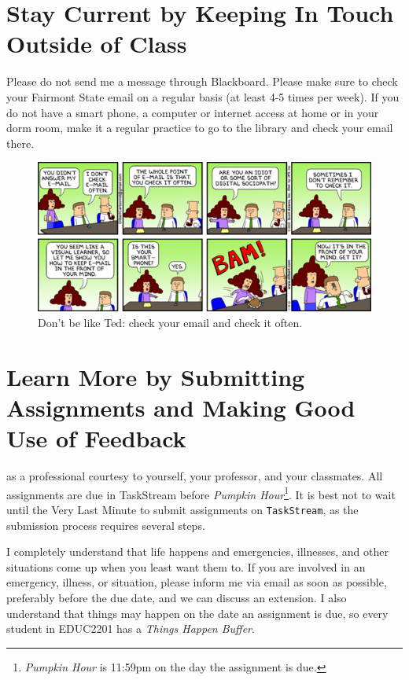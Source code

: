 \documentclass{tufte-handout}
\begin{document}
\section{Stay Current by Keeping In Touch Outside of Class}

 Please do not send me a message through Blackboard. Please make sure to check your Fairmont State email on a regular basis (at least 4-5 times per week). If you do not have a smart phone, a computer or internet access at home or in your dorm room, make it a regular practice to go to the library and check your email there.

\begin{figure}%
  \includegraphics[width=\linewidth]{dilbert-email.png}
  \caption{Don't be like Ted: check your email and check it often.}
  \label{fig:dilbert-email}
\end{figure}

\section{Learn More by Submitting Assignments and Making Good Use of Feedback}
 as a professional courtesy to yourself, your professor, and your classmates. All assignments are due in TaskStream before \textit{Pumpkin Hour}\footnote{\textit{Pumpkin Hour} is 11:59pm on the day the assignment is due.}. It is best not to wait until the Very Last Minute to submit assignments on \texttt{TaskStream}, as the submission process requires several steps.

I completely understand that life happens and emergencies, illnesses, and other situations come up when you least want them to. If you are involved in an emergency, illness, or situation, please inform me via email as soon as possible, preferably before the due date, and we can discuss an extension. I also understand that things may happen on the date an assignment is due, so every student in EDUC2201 has a \textit{Things Happen Buffer}.
\end{document}
